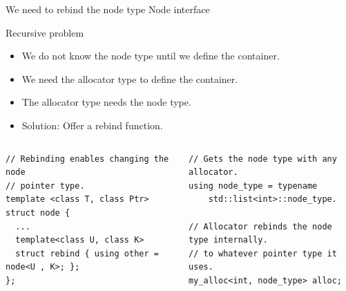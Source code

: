 \documentclass[10pt,aspectratio=169]{beamer}
\begin{document}
\begin{frame}[fragile]
{We need to rebind the node type}
{Node interface}

\begin{block}{Recursive problem}
\begin{itemize}
\item We do not know the node type until we define the container.
\item We need the allocator type to define the container.
\item The allocator type needs the node type.
\item {\color{alertc}Solution: Offer a rebind function.}
\end{itemize}
\end{block}

\begin{columns}
\begin{column}[t]{0.47\textwidth}
\begin{lstlisting}
// Rebinding enables changing the node
// pointer type.
template <class T, class Ptr>
struct node {
  ...
  template<class U, class K>
  struct rebind { using other = node<U , K>; };
};

\end{lstlisting}

\end{column}

\begin{column}[t]{0.47\textwidth}
\begin{lstlisting}
// Gets the node type with any allocator.
using node_type = typename
    std::list<int>::node_type.

// Allocator rebinds the node type internally.
// to whatever pointer type it uses.
my_alloc<int, node_type> alloc;
\end{lstlisting}
\end{column}
\end{columns}
\end{frame}
\end{document}
